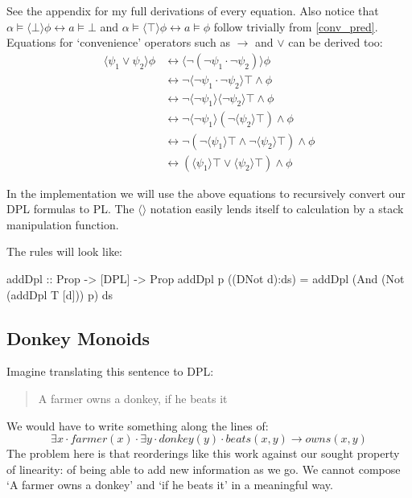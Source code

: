 \documentclass[12pt]{article}
\begin{document}
See the appendix for my full derivations of every equation. Also notice that $\alpha\models\langle\bot\rangle\phi\leftrightarrow a\models\bot$ and $\alpha\models\langle\top\rangle\phi\leftrightarrow a\models\phi$ follow trivially from \eqref{conv_pred}. Equations for `convenience' operators such as $\rightarrow$ and $\vee$ can be derived too:
\begin{align}
\langle\psi_1\vee\psi_2\rangle\phi
& \leftrightarrow \langle\neg(\neg\psi_1\cdot\neg\psi_2)\rangle\phi \nonumber\\
& \leftrightarrow \neg\langle\neg\psi_1\cdot\neg\psi_2\rangle\top \wedge\phi \nonumber\\
& \leftrightarrow \neg\langle\neg\psi_1\rangle\langle\neg\psi_2\rangle\top \wedge\phi \nonumber\\
& \leftrightarrow \neg\langle\neg\psi_1\rangle(\neg\langle\psi_2\rangle\top) \wedge\phi \nonumber\\
& \leftrightarrow \neg(\neg\langle\psi_1\rangle\top \wedge \neg\langle\psi_2\rangle\top) \wedge\phi \nonumber\\
& \leftrightarrow (\langle\psi_1\rangle\top \vee \langle\psi_2\rangle\top) \wedge\phi \label{conv_vee}
\end{align}

In the implementation we will use the above equations to recursively convert our DPL formulas to PL. The $\langle\rangle$ notation easily lends itself to calculation by a stack manipulation function.

The rules will look like:
\begin{haskell}
addDpl :: Prop -> [DPL] -> Prop
addDpl p ((DNot d):ds) = addDpl (And (Not (addDpl T [d])) p) ds
\end{haskell}


\subsection{Donkey Monoids}

Imagine translating this sentence to DPL:
%
\begin{quotation}
A farmer owns a donkey, if he beats it
\end{quotation}
%
We would have to write something along the lines of:
%
\begin{equation}
\exists x \cdot farmer(x) \cdot \exists y \cdot donkey(y) \cdot beats(x,y) \rightarrow owns(x,y)
\end{equation}
%
The problem here is that reorderings like this work against our sought property of linearity: of being able to add new information as we go. We cannot compose `A farmer owns a donkey' and `if he beats it' in a meaningful way.
\end{document}
